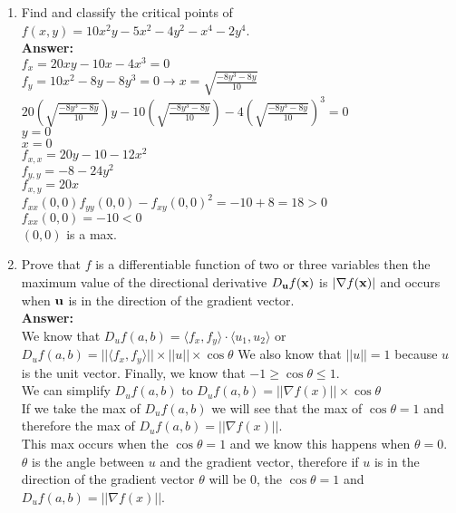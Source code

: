 \documentclass[11pt]{article}
\begin{document}
\begin{enumerate}
   
   \item Find and classify the critical points of $f(x,y) = 10x^2y - 5x^2 - 4y^2-x^4 - 2y^4$.  
   \\
   \textbf{Answer:}
   \\
   $f_x=20xy-10x-4x^3=0$
   \\
   $f_y=10x^2-8y-8y^3=0 \rightarrow x=\sqrt{\frac{-8y^3-8y}{10}}$
   \\
   $20(\sqrt{\frac{-8y^3-8y}{10}})y-10(\sqrt{\frac{-8y^3-8y}{10}})-4(\sqrt{\frac{-8y^3-8y}{10}})^3=0$
   \\
   $y=0$
   \\
   $x=0$
   \\
   $f_{x,x}=20y-10-12x^2$
   \\
   $f_{y,y}=-8-24y^2$
   \\
   $f_{x,y}=20x$
   \\
   $f_{xx}(0,0)f_{yy}(0,0)-f_{xy}(0,0)^2=-10+8=18 >0 $
   \\$f_{xx}(0,0)=-10 < 0$
   \\
   $(0,0)$ is a max.
   
   
   \item Prove that $f$ is a differentiable function of two or three variables then the maximum value of the directional derivative $D_{\bf u}f({\bf x})$ is $| \nabla f({\bf x})|$ and occurs when ${\bf u}$ is in the direction of the gradient vector.
   \\
   \textbf{Answer:}
   \\
   We know that $D_uf(a,b)= \langle f_x, f_y \rangle \cdot \langle u_1,u_2 \rangle$ or $D_uf(a,b)= ||\langle f_x, f_y \rangle|| \times ||u|| \times \cos \theta$ We also know that $||u||=1$ because $u$ is the unit vector. Finally, we know that $-1 \ge \cos \theta \le 1$.
   \\
   We can simplify $D_uf(a,b)$ to $D_uf(a,b)= ||\nabla f(x)|| \times \cos \theta$  
   \\
   If we take the max of $D_uf(a,b)$ we will see that the max of $\cos \theta =1$ and therefore the max of $D_uf(a,b)= ||\nabla f(x)||$. 
   \\
   This max occurs when the $\cos \theta =1$ and we know this happens when $\theta = 0$. $\theta$ is the angle between $u$ and the gradient vector, therefore if $u$ is in the direction of the gradient vector $\theta$ will be $0$, the $\cos \theta =1$ and $D_uf(a,b)= ||\nabla f(x)||$. 
   

\end{enumerate}
\end{document}
